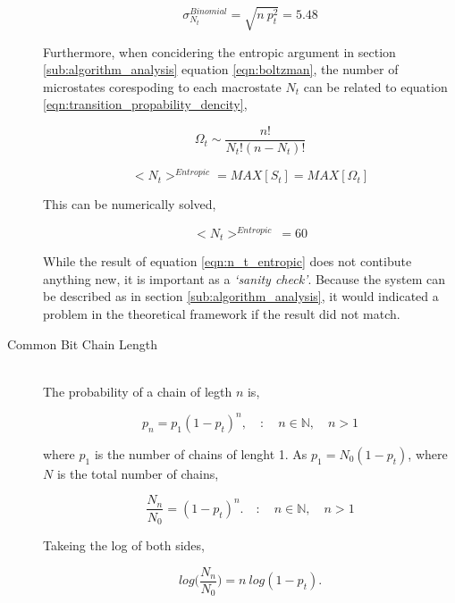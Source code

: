 \begin{description}
					\begin{equation}
						\sigma_{N_t}^{Binomial} = \sqrt{ n\ p_{t}^2} = 5.48
					\end{equation}

					Furthermore, when concidering the entropic argument in section \ref{sub:algorithm_analysis} equation \ref{eqn:boltzman}, the number of microstates corespoding to each macrostate $N_t$ can be related to equation \ref{eqn:transition_propability_dencity},

					\begin{equation}
						\Omega_t \sim \frac{n!}{N_{t}!(n-N_{t})!}
					\end{equation}

					\begin{equation}
						<N_t>^{Entropic} = MAX[S_t] = MAX[\Omega_t]
					\end{equation}

					This can be numerically solved,

					\begin{equation}
						<N_t>^{Entropic}\ = 60
						\label{eqn:n_t_entropic}
					\end{equation}

					While the result of equation \ref{eqn:n_t_entropic} does not contibute anything new, it is important as a \textit{`sanity check'}.
					Because the system can be described as in section \ref{sub:algorithm_analysis}, it would indicated a problem in the theoretical framework if the result did not match.


				\item[Common Bit Chain Length] \hfill \\
					
					The probability of a chain of legth $n$ is,

					\begin{equation}
						p_n = p_1(1 - p_t)^n, \quad : \quad n \in \mathbb{N}, \quad n > 1
					\end{equation}

					where $p_1$ is the number of chains of lenght 1. 
					As $p_1 = N_0 (1 -p_t)$, where $N$ is the total number of chains,

					\begin{equation}
						\frac{N_n}{N_0} = (1 - p_t)^n. \quad : \quad n \in \mathbb{N}, \quad n > 1
					\end{equation}

					Takeing the log of both sides,

					\begin{equation}
						log\bigg(\frac{N_n}{N_0}\bigg) = n\ log(1 - p_t).
					\end{equation}


\end{description}
